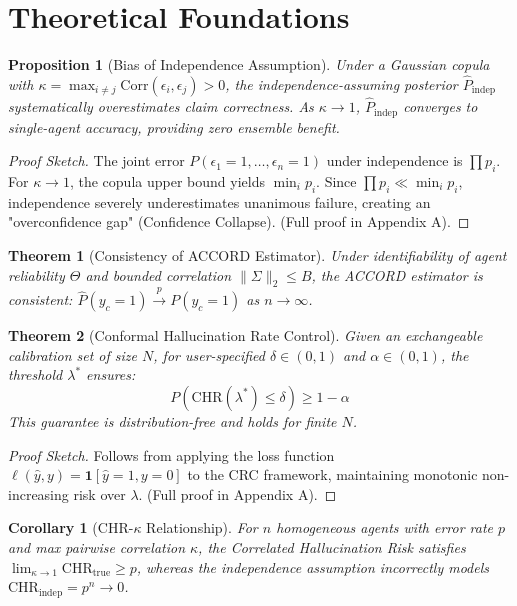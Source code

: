 \documentclass[conference]{IEEEtran}
\newtheorem{theorem}{Theorem}
\newtheorem{proposition}{Proposition}
\newtheorem{corollary}{Corollary}
\begin{document}
\section{Theoretical Foundations}

\begin{proposition}[Bias of Independence Assumption]
\label{prop:bias}
Under a Gaussian copula with $\kappa = \max_{i \neq j} \mathrm{Corr}(\epsilon_i, \epsilon_j) > 0$, the independence-assuming posterior $\hat{P}_\text{indep}$ systematically overestimates claim correctness. As $\kappa \to 1$, $\hat{P}_\text{indep}$ converges to single-agent accuracy, providing zero ensemble benefit.
\end{proposition}
\begin{proof}[Proof Sketch]
The joint error $P(\epsilon_1=1, \dots, \epsilon_n=1)$ under independence is $\prod p_i$. For $\kappa \to 1$, the copula upper bound yields $\min_i p_i$. Since $\prod p_i \ll \min_i p_i$, independence severely underestimates unanimous failure, creating an "overconfidence gap" (Confidence Collapse). (Full proof in Appendix A).
\end{proof}

\begin{theorem}[Consistency of ACCORD Estimator]
\label{thm:consistency}
Under identifiability of agent reliability $\Theta$ and bounded correlation $\|\Sigma\|_2 \leq B$, the ACCORD estimator is consistent: $\hat{P}(y_c = 1) \xrightarrow{p} P(y_c = 1)$ as $n \to \infty$.
\end{theorem}

\begin{theorem}[Conformal Hallucination Rate Control]
\label{thm:guarantee}
Given an exchangeable calibration set of size $N$, for user-specified $\delta \in (0,1)$ and $\alpha \in (0,1)$, the threshold $\lambda^*$ ensures:
\begin{equation}
  P\!\left(\mathrm{CHR}(\lambda^*) \leq \delta\right) \geq 1 - \alpha
\end{equation}
This guarantee is distribution-free and holds for finite $N$.
\end{theorem}
\begin{proof}[Proof Sketch]
Follows from applying the loss function $\ell(\hat{y}, y) = \mathbf{1}[\hat{y}=1, y=0]$ to the CRC framework, maintaining monotonic non-increasing risk over $\lambda$. (Full proof in Appendix A).
\end{proof}

\begin{corollary}[CHR-$\kappa$ Relationship]
\label{cor:chr_kappa}
For $n$ homogeneous agents with error rate $p$ and max pairwise correlation $\kappa$, the Correlated Hallucination Risk satisfies $\lim_{\kappa \to 1} \text{CHR}_{\text{true}} \geq p$, whereas the independence assumption incorrectly models $\text{CHR}_{\text{indep}} = p^n \to 0$.
\end{corollary}
\end{document}
